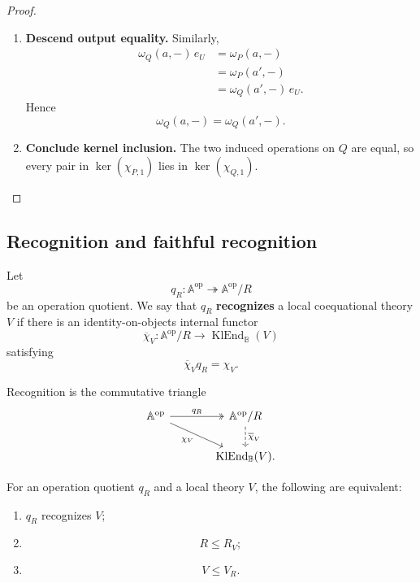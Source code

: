 \begin{proof}
\begin{enumerate}
        \item \textbf{Descend output equality.}
        Similarly,
        \[
        \begin{aligned}
            \omega_Q(a,-)\,e_U
            &=
            \omega_P(a,-)
            \\
            &=
            \omega_P(a',-)
            \\
            &=
            \omega_Q(a',-)\,e_U.
        \end{aligned}
        \]
        Hence
        \[
            \omega_Q(a,-)=\omega_Q(a',-).
        \]

        \item \textbf{Conclude kernel inclusion.}
        The two induced operations on \(Q\) are equal, so every pair in
        \(\ker(\chi_{P,1})\) lies in \(\ker(\chi_{Q,1})\).
    \end{enumerate}
\end{proof}

\subsection{Recognition and faithful recognition}
\label{subsec:to-recognition-faithful-recognition}

\begin{definition}
\label{def:to-recognition-operation-quotient}
    Let
    \[
        q_R:
        \mathbb A^{\mathrm{op}}
        \twoheadrightarrow
        \mathbb A^{\mathrm{op}}/R
    \]
    be an operation quotient. We say that \(q_R\)
    \textbf{recognizes} a local coequational theory \(V\) if there is an
    identity-on-objects internal functor
    \[
        \overline\chi_V:
        \mathbb A^{\mathrm{op}}/R
        \to
        \operatorname{KlEnd}_{\mathbb B}(V)
    \]
    satisfying
    \[
        \overline\chi_Vq_R=\chi_V.
    \]
\end{definition}

Recognition is the commutative triangle
\[
\begin{tikzcd}[column sep=large]
    \mathbb A^{\mathrm{op}}
        \arrow[r, two heads, "q_R"]
        \arrow[dr, "\chi_V"']
    &
    \mathbb A^{\mathrm{op}}/R
        \arrow[d, dashed, "\overline\chi_V"]
    \\
    &
    \operatorname{KlEnd}_{\mathbb B}(V).
\end{tikzcd}
\]

\begin{proposition}
\label{prop:to-recognition-criterion}
    For an operation quotient \(q_R\) and a local theory \(V\), the following
    are equivalent:
    \begin{enumerate}
        \item \(q_R\) recognizes \(V\);
        \item
        \[
            R\leq R_V;
        \]
        \item
        \[
            V\leq V_R.
        \]
    \end{enumerate}
\end{proposition}

